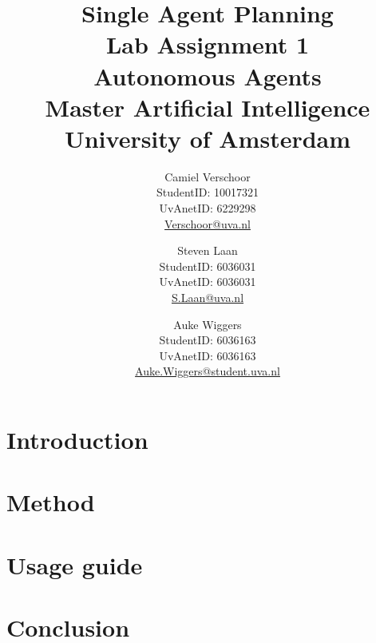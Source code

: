 \documentclass[a4paper]{article}
\title{Single Agent Planning\\\large Lab Assignment 1\\Autonomous Agents\\Master Artificial Intelligence\\University of Amsterdam}
\author{Camiel Verschoor\\StudentID: 10017321\\UvAnetID: 6229298\\ \url{Verschoor@uva.nl} \and Steven Laan\\StudentID: 6036031\\UvAnetID: 6036031\\\url{S.Laan@uva.nl} \and Auke Wiggers\\StudentID: 6036163\\UvAnetID: 6036163\\\url{Auke.Wiggers@student.uva.nl}}
\begin{document}
\maketitle

\section{Introduction}

\section{Method}

\section{Usage guide}

\section{Conclusion}
\end{document}
